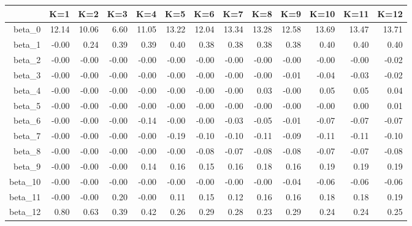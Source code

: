 \begin{table}[ht]
\centering
\begin{tabular}{rrrrrrrrrrrrr}
  \hline
 & K=1 & K=2 & K=3 & K=4 & K=5 & K=6 & K=7 & K=8 & K=9 & K=10 & K=11 & K=12 \\ 
  \hline
beta\_0 & 12.14 & 10.06 & 6.60 & 11.05 & 13.22 & 12.04 & 13.34 & 13.28 & 12.58 & 13.69 & 13.47 & 13.71 \\ 
  beta\_1 & -0.00 & 0.24 & 0.39 & 0.39 & 0.40 & 0.38 & 0.38 & 0.38 & 0.38 & 0.40 & 0.40 & 0.40 \\ 
  beta\_2 & -0.00 & -0.00 & -0.00 & -0.00 & -0.00 & -0.00 & -0.00 & -0.00 & -0.00 & -0.00 & -0.00 & -0.02 \\ 
  beta\_3 & -0.00 & -0.00 & -0.00 & -0.00 & -0.00 & -0.00 & -0.00 & -0.00 & -0.01 & -0.04 & -0.03 & -0.02 \\ 
  beta\_4 & -0.00 & -0.00 & -0.00 & -0.00 & -0.00 & -0.00 & -0.00 & 0.03 & -0.00 & 0.05 & 0.05 & 0.04 \\ 
  beta\_5 & -0.00 & -0.00 & -0.00 & -0.00 & -0.00 & -0.00 & -0.00 & -0.00 & -0.00 & -0.00 & 0.00 & 0.01 \\ 
  beta\_6 & -0.00 & -0.00 & -0.00 & -0.14 & -0.00 & -0.00 & -0.03 & -0.05 & -0.01 & -0.07 & -0.07 & -0.07 \\ 
  beta\_7 & -0.00 & -0.00 & -0.00 & -0.00 & -0.19 & -0.10 & -0.10 & -0.11 & -0.09 & -0.11 & -0.11 & -0.10 \\ 
  beta\_8 & -0.00 & -0.00 & -0.00 & -0.00 & -0.00 & -0.08 & -0.07 & -0.08 & -0.08 & -0.07 & -0.07 & -0.08 \\ 
  beta\_9 & -0.00 & -0.00 & -0.00 & 0.14 & 0.16 & 0.15 & 0.16 & 0.18 & 0.16 & 0.19 & 0.19 & 0.19 \\ 
  beta\_10 & -0.00 & -0.00 & -0.00 & -0.00 & -0.00 & -0.00 & -0.00 & -0.00 & -0.04 & -0.06 & -0.06 & -0.06 \\ 
  beta\_11 & -0.00 & -0.00 & 0.20 & -0.00 & 0.11 & 0.15 & 0.12 & 0.16 & 0.16 & 0.18 & 0.18 & 0.19 \\ 
  beta\_12 & 0.80 & 0.63 & 0.39 & 0.42 & 0.26 & 0.29 & 0.28 & 0.23 & 0.29 & 0.24 & 0.24 & 0.25 \\ 
   \hline
\end{tabular}
\end{table}
